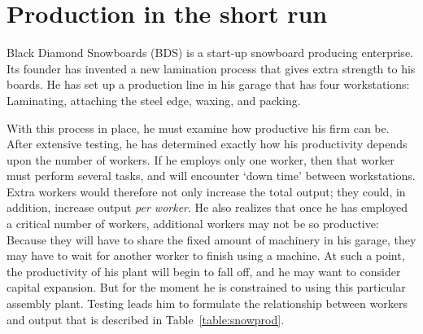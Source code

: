 \section{Production in the short run}\label{sec:ch8sec3}

Black Diamond Snowboards (BDS) is a start-up snowboard producing enterprise.
Its founder has invented a new lamination process that gives extra strength
to his boards. He has set up a production line in his garage that has four
workstations: Laminating, attaching the steel edge, waxing, and packing.

With this process in place, he must examine how productive his firm can be.
After extensive testing, he has determined exactly how his productivity
depends upon the number of workers. If he employs only one worker, then that
worker must perform several tasks, and will encounter `down time' between
workstations. Extra workers would therefore not only increase the total
output; they could, in addition, increase output \textit{per worker}. He
also realizes that once he has employed a critical number of workers,
additional workers may not be so productive: Because they will have to share
the fixed amount of machinery in his garage, they may have to wait for
another worker to finish using a machine. At such a point, the productivity
of his plant will begin to fall off, and he may want to consider capital
expansion. But for the moment he is constrained to using this particular
assembly plant. Testing leads him to formulate the relationship between
workers and output that is described in Table~\ref{table:snowprod}.

